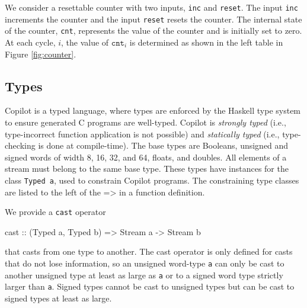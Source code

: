 \begin{example}
We consider a resettable counter with two inputs, {\tt inc} and {\tt reset}.
The input {\tt inc} increments the counter and the input {\tt reset} resets the
counter. The internal state of the counter, {\tt cnt}, represents the value of the
counter and is initially set to zero. At each cycle, $i$, the value of
$\mathtt{cnt}_i$ is determined as shown in the left table in Figure
\ref{fig:counter}.
\end{example}


\subsection{Types} \label{sec:types}

Copilot is a typed language, where types are enforced by the Haskell
type system to ensure generated C programs are well-typed.  Copilot is
\emph{strongly typed} (i.e., type-incorrect function application is
not possible) and \emph{statically typed} (i.e., type-checking is done
at compile-time).  The base types are Booleans, unsigned and signed
words of width 8, 16, 32, and 64, floats, and doubles.  All elements
of a stream must belong to the same base type.  These types have
instances for the class {\tt Typed a}, used to constrain Copilot
programs. The constraining type classes are listed to the left of the
$\texttt{=>}$ in a function definition.

We provide a {\tt cast} operator
%
\begin{code}
cast :: (Typed a, Typed b) => Stream a -> Stream b  
\end{code}
%
that casts from one type to another.  The cast operator is only defined for
casts that do not lose information, so an unsigned word-type {\tt a} can only be
cast to another unsigned type at least as large as {\tt a} or to a signed word
type strictly larger than {\tt a}.  Signed types cannot be cast to unsigned
types but can be cast to signed types at least as large.

